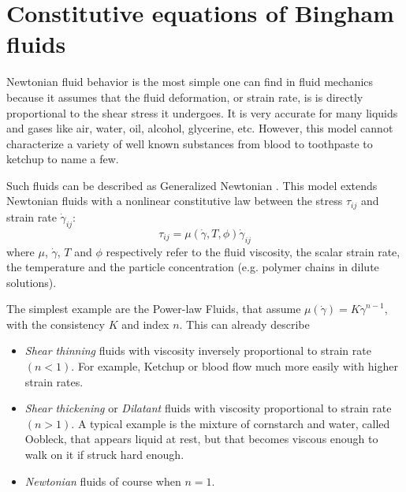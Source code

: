 \documentclass[11 pt]{report}
\begin{document}
\section{Constitutive equations of Bingham fluids}

Newtonian fluid behavior is the most simple one can find in fluid mechanics because it assumes that the fluid deformation, or strain rate, is is directly proportional to the shear stress it undergoes. It is very accurate for many liquids and gases like air, water, oil, alcohol, glycerine, etc. However, this model cannot characterize a variety of well known substances from blood to toothpaste to ketchup to name a few.

Such fluids can be described as Generalized Newtonian \cite{Geophysical}. This model extends Newtonian fluids with a nonlinear constitutive law between the stress $\tau_{ij}$ and strain rate $\dot\gamma_{ij}$:
\begin{equation}
    \tau_{ij} = \mu(\dot \gamma, T, \phi) \dot \gamma_{ij}
    \label{eq:power-law}
\end{equation}
where $\mu$, $\dot \gamma$, $T$ and $\phi$ respectively refer to the fluid viscosity, the scalar strain rate, the temperature and the particle concentration (e.g. polymer chains in dilute solutions).

The simplest example are the Power-law Fluids, that assume $\mu(\dot\gamma) = K \dot \gamma^{n-1}$, with the consistency $K$ and index $n$. This can already describe
\begin{itemize}[label=---, topsep=0pt]
    \setlength{\itemsep}{0pt}
    \item\textit{Shear thinning} fluids with viscosity inversely proportional to strain rate $(n<1)$. For example, Ketchup or blood flow much more easily with higher strain rates.
    \item\textit{Shear thickening} or \textit{Dilatant} fluids with viscosity proportional to strain rate $(n>1)$. A typical example is the mixture of cornstarch and water, called Oobleck, that appears liquid at rest, but that becomes viscous enough to walk on it if struck hard enough.
    \item \textit{Newtonian} fluids of course when $n=1$.
\end{itemize}
\end{document}
